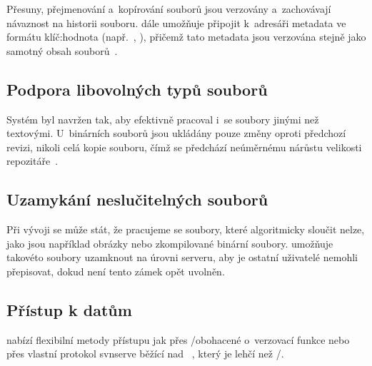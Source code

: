 Přesuny, přejmenování a~kopírování souborů jsou verzovány a~zachovávají návaznost na historii souboru. \SVN dále umožňuje připojit k~adresáři metadata ve formátu klíč:hodnota (např.\ , ), přičemž tato metadata jsou verzována stejně jako samotný obsah souborů~\cite{svnbook17}.


\subsection*{Podpora libovolných typů souborů}
\label{sec:svn_binary}
Systém byl navržen tak, aby efektivně pracoval i~se soubory jinými než textovými. U~binárních souborů jsou ukládány pouze změny oproti předchozí revizi, nikoli celá kopie souboru, čímž se předchází neúměrnému nárůstu velikosti repozitáře~\cite{svnbook17}.


\subsection*{Uzamykání neslučitelných souborů}
\label{sec:svn_locking}
Při vývoji se může stát, že pracujeme se soubory, které algoritmicky sloučit nelze, jako jsou například obrázky nebo zkompilované binární soubory. \SVN umožňuje takovéto soubory uzamknout na úrovni serveru, aby je ostatní uživatelé nemohli přepisovat, dokud není tento zámek opět uvolněn.


\subsection*{Přístup k datům}
\label{sec:svn_access}
\SVN nabízí flexibilní metody přístupu jak přes \HTTP/\HTTPS obohacené o~verzovací funkce nebo přes vlastní protokol svnserve běžící nad \TCPIP~\cite{svnbook17}, který je lehčí než \HTTP/\HTTPS.



\endinput